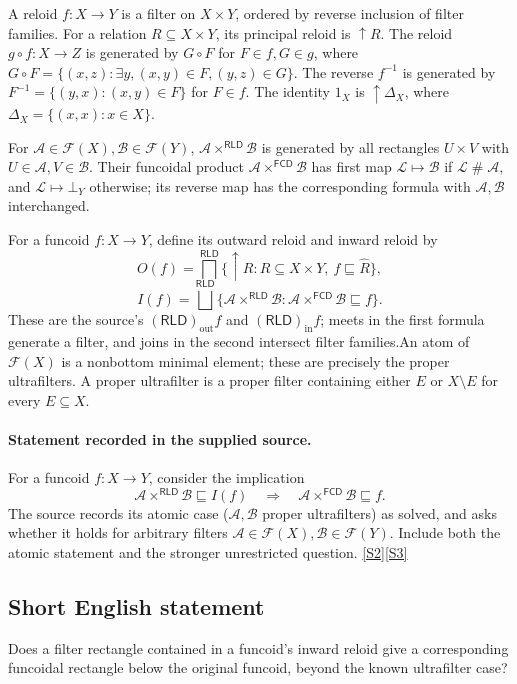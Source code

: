 \documentclass[11pt]{article}
\newcommand{\sref}[2]{\hyperlink{source:#1:#2}{[S#2]}}
\begin{document}
A reloid $f:X\to Y$ is a filter on $X\times Y$, ordered by reverse inclusion of filter families. For a relation $R\subseteq X\times Y$, its principal reloid is $\uparrow R$. The reloid $g\circ f:X\to Z$ is generated by $G\circ F$ for $F\in f,G\in g$, where $G\circ F=\{(x,z):\exists y,(x,y)\in F,(y,z)\in G\}$. The reverse $f^{-1}$ is generated by $F^{-1}=\{(y,x):(x,y)\in F\}$ for $F\in f$. The identity $1_X$ is $\uparrow\Delta_X$, where $\Delta_X=\{(x,x):x\in X\}$.

For $\mathcal A\in\mathcal F(X),\mathcal B\in\mathcal F(Y)$, $\mathcal A\times^{\mathsf{RLD}}\mathcal B$ is generated by all rectangles $U\times V$ with $U\in\mathcal A,V\in\mathcal B$. Their funcoidal product $\mathcal A\times^{\mathsf{FCD}}\mathcal B$ has first map $\mathcal L\mapsto\mathcal B$ if $\mathcal L\mathrel{\#}\mathcal A$, and $\mathcal L\mapsto\bot_Y$ otherwise; its reverse map has the corresponding formula with $\mathcal A,\mathcal B$ interchanged.

For a funcoid $f:X\to Y$, define its outward reloid and inward reloid by
\[
 O(f)=\bigsqcap^{\mathsf{RLD}}\{\uparrow R:R\subseteq X\times Y,\ f\sqsubseteq\widehat R\},
\]
\[
 I(f)=\bigsqcup^{\mathsf{RLD}}\{\mathcal A\times^{\mathsf{RLD}}\mathcal B:
       \mathcal A\times^{\mathsf{FCD}}\mathcal B\sqsubseteq f\}.
\]
These are the source's $(\mathsf{RLD})_{\mathrm{out}}f$ and $(\mathsf{RLD})_{\mathrm{in}}f$; meets in the first formula generate a filter, and joins in the second intersect filter families.An atom of $\mathcal F(X)$ is a nonbottom minimal element; these are precisely the proper ultrafilters. A proper ultrafilter is a proper filter containing either $E$ or $X\setminus E$ for every $E\subseteq X$.
\paragraph{Statement recorded in the supplied source.}
For a funcoid $f:X\to Y$, consider the implication
\[
 \mathcal A\times^{\mathsf{RLD}}\mathcal B\sqsubseteq I(f)
 \quad\Longrightarrow\quad
 \mathcal A\times^{\mathsf{FCD}}\mathcal B\sqsubseteq f.
\]
The source records its atomic case ($\mathcal A,\mathcal B$ proper ultrafilters) as solved, and asks whether it holds for arbitrary filters $\mathcal A\in\mathcal F(X),\mathcal B\in\mathcal F(Y)$. Include both the atomic statement and the stronger unrestricted question. \sref{statement}{2}\sref{statement}{3}
\subsection{Short English statement}
Does a filter rectangle contained in a funcoid’s inward reloid give a corresponding funcoidal rectangle below the original funcoid, beyond the known ultrafilter case?
\end{document}
